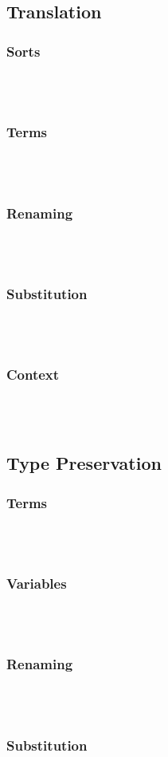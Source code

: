 \subsection{Translation}
\subsubsection{Sorts}\hfill\\\\
\DPTSort
\subsubsection{Terms}\hfill\\\\
\DPTType
\DPTKind
\DPTTerms
\subsubsection{Renaming}\hfill\\\\
\DPTRen
\subsubsection{Substitution}\hfill\\\\
\DPTSub
\subsubsection{Context}\hfill\\\\
\DPTCtx
\subsection{Type Preservation}
\subsubsection{Terms}\hfill\\\\
\DPTTermPres
\subsubsection{Variables}\hfill\\\\
\DPTVarPresLookup
\DPTOVarPresLookup
\subsubsection{Renaming}\hfill\\\\
\DPTVarPresRen
\DPTTypePresRen
\DPTTypePresWk
\DPTTypePresWkInst
\subsubsection{Substitution}\hfill\\\\
\DPTVarPresSub
\DPTTypePresSub
\DPTTypePresSingleSub